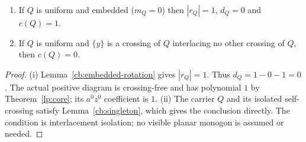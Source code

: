 \begin{lemma}\label{lem:corner-values}
\begin{enumerate}
\item[(i)] If $Q$ is uniform and embedded ($m_Q=0$) then $|r_Q|=1$, $d_Q=0$
and $c(Q)=1$.
\item[(ii)] If $Q$ is uniform and $\{y\}$ is a crossing of $Q$ interlacing no
other crossing of $Q$, then $c(Q)=0$.
\end{enumerate}
\end{lemma}
\begin{proof}
(i) Lemma~\ref{cb:embedded-rotation} gives $|r_Q|=1$. Thus
$d_Q=1-0-1=0$. The actual positive diagram is crossing-free and has
polynomial $1$ by Theorem~\ref{lp:core}; its $a^0z^0$ coefficient is $1$.
(ii) The carrier $Q$ and its isolated self-crossing satisfy
Lemma~\ref{cb:singleton}, which gives the conclusion directly. The
condition is interlacement isolation; no visible planar monogon is
assumed or needed.
\end{proof}

